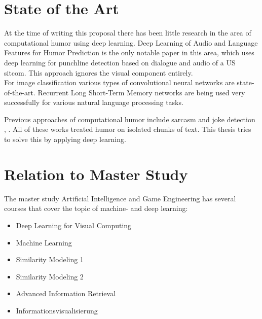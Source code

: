 \documentclass[11pt]{article}
\begin{document}
\pagebreak
\section{State of the Art}

At the time of writing this proposal there has been little research in the area of computational humor using deep learning. Deep Learning of Audio and Language Features for Humor Prediction is the only notable paper in this area, which uses deep learning for punchline detection based on dialogue and audio of a US sitcom. This approach ignores the visual component entirely. \\

For image classification various types of convolutional neural networks are state-of-the-art. Recurrent Long Short-Term Memory networks are being used very successfully for various natural language processing tasks.

Previous approaches of computational humor include sarcasm and joke detection \cite{Yang2015HumorRA}, . All of these works treated humor on isolated chunks of text. This thesis tries to solve this by applying deep learning.

\pagebreak
\section{Relation to Master Study}
The master study Artificial Intelligence and Game Engineering has several courses that cover the topic of machine- and deep learning:

\begin{itemize}
\item Deep  Learning  for  Visual  Computing
\item Machine Learning
\item Similarity Modeling 1
\item Similarity Modeling 2
\item Advanced Information Retrieval
\item Informationsvisualisierung
\end{itemize}

\printbibliography
\end{document}

